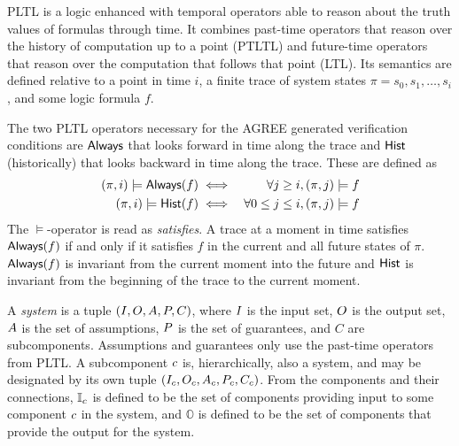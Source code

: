 PLTL is a logic enhanced with temporal operators able to
reason about the truth values of formulas through time.
It combines past-time operators that reason over the history of computation up to a point (PTLTL) and future-time operators that reason over the computation that follows that point (LTL).
Its semantics
are defined relative to a point in time $i$, a finite trace of
system states $\pi = s_0, s_1, \ldots, s_i$, and some logic formula $f$.

The two PLTL operators necessary for the AGREE generated verification
conditions are $\mathsf{Always}$ that looks forward in time along
the trace and $\mathsf{Hist}$ (historically) that looks backward in
time along the trace.  These are defined as
\begin{eqnarray*}
 (\pi, i) \models \mathsf{Always}(f) & \iff & \forall j \ge i, (\pi, j) \models f \\
(\pi, i) \models \mathsf{Hist}(f) & \iff & \forall 0 \le j \le i, (\pi, j) \models f
\end{eqnarray*}
The $\models$-operator is read as \emph{satisfies}.  A trace at a
moment in time satisfies $\mathsf{Always}(f)$ if and only if it satisfies
$f$ in the current and all future states of $\pi$.  $\mathsf{Always}(f)$ is
invariant from the current moment into the future and $\mathsf{Hist}$ is
invariant from the beginning of the trace to the current moment.

A \emph{system} is a tuple $(I, O, A,
P,C)$, where $I$ is the input set, $O$ is the
output set, $A$ is the set of assumptions, $P$ is the
set of guarantees, and $C$ are subcomponents.  Assumptions and guarantees only use the past-time operators from PLTL. A subcomponent
$c$ is, hierarchically, also a system, and may be designated
by its own tuple $(I_{c}, O_{c},
A_{c}, P_{c}, C_c)$.  From the
components and their connections, $\mathbb{I}_{c}$ is defined
to be the set of components providing input to some component
$c$ in the system, and $\mathbb{O}$ is defined to be the set
of components that provide the output for the system.  

